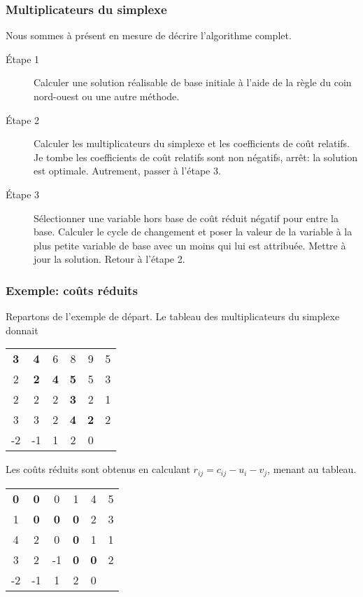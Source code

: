 \documentclass[usepdftitle=false]{beamer}
\begin{document}
\begin{frame}
	\frametitle{Multiplicateurs du simplexe}
	
Nous sommes à présent en mesure de décrire l'algorithme complet.

\begin{description}
\item[\'Etape 1]
Calculer une solution réalisable de base initiale à l'aide de la règle du coin nord-ouest ou une autre méthode.
\item[\'Etape 2]
Calculer les multiplicateurs du simplexe et les coefficients de coût relatifs. Je tombe
les coefficients de coût relatifs sont non négatifs, arrêt: la solution est optimale. Autrement,
passer à l'étape 3.
\item[\'Etape 3]
Sélectionner une variable hors base de coût réduit négatif pour entre la base.
Calculer le cycle de changement et poser la valeur de la variable à la plus petite variable de base avec un moins qui lui est attribuée.
Mettre à jour la solution. Retour à l'étape 2.
\end{description}

\end{frame}

\begin{frame}
\frametitle{Exemple: coûts réduits}

Repartons de l'exemple de départ. Le tableau des multiplicateurs du simplexe donnait
\begin{center}
	\begin{tabular}{ccccc|c}
		{\bf 3} & {\bf 4} & 6 & 8 & 9 & 5 \\
		2 & {\bf 2} & {\bf 4} & {\bf 5} & 5 & 3 \\
		2 & 2 & 2 & {\bf 3} & 2 & 1 \\
		3 & 3 & 2 & {\bf 4} & {\bf 2} & 2 \\
		\hline
		-2 & -1 & 1 & 2 & 0 & 
	\end{tabular}
\end{center}
Les coûts réduits sont obtenus en calculant $r_{ij} = c_{ij} - u_i - v_j$, menant au tableau.
\begin{center}
	\begin{tabular}{ccccc|c}
		{\bf 0} & {\bf 0} & 0 & 1 & 4 & 5 \\
		1 & {\bf 0} & {\bf 0} & {\bf 0} & 2 & 3 \\
		4 & 2 & 0 & {\bf 0} & 1 & 1 \\
		3 & 2 & -1 & {\bf 0} & {\bf 0} & 2 \\
		\hline
		-2 & -1 & 1 & 2 & 0 & 
	\end{tabular}
\end{center}

\end{frame}
\end{document}
